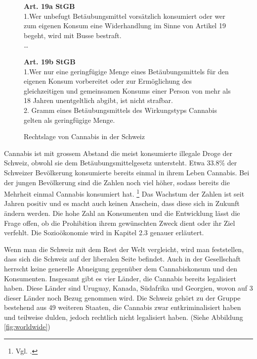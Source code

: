 \documentclass[../main.tex]{subfiles}
\begin{document}
	 \begin{figure}[H]
	 \begin{tcolorbox}
	 	\textbf{Art. 19a StGB}\\[7pt]
		1.\quad Wer unbefugt Betäubungsmittel vorsätzlich konsumiert oder wer zum eigenen Konsum eine Widerhandlung im Sinne von Artikel 19 begeht, wird mit Busse bestraft.\\[10pt]
		\ldots
	\end{tcolorbox}
	
	\begin{tcolorbox}
		\textbf{Art. 19b StGB}\\[7pt]
	 	1.\quad Wer nur eine geringfügige Menge eines Betäubungsmittels für den eigenen Konsum vorbereitet oder zur Ermöglichung des gleichzeitigen und gemeinsamen Konsums einer Person von mehr als 18 Jahren unentgeltlich abgibt, ist nicht strafbar.\\[10pt]
2. Gramm eines Betäubungsmittels des Wirkungstyps Cannabis gelten als geringfügige Menge.
	 \end{tcolorbox}
	 \captionsetup{font=small}
	 \caption{Rechtslage von Cannabis in der Schweiz}
	 \label{fig:stgb-art-19}
	 \end{figure}
	 
	 
	 \noindent
	 Cannabis ist mit grossem Abstand die meist konsumierte illegale Droge der Schweiz, obwohl sie dem Betäubungsmittelgesetz untersteht. 
	 Etwa 33.8\% der Schweizer Bevölkerung konsumierte bereits einmal in ihrem Leben Cannabis. 
	 Bei der jungen Bevölkerung sind die Zahlen noch viel höher, sodass bereits die Mehrheit einmal Cannabis konsumiert hat.%
	 \footnote{Vgl. \cite[85]{gmel}.}
	 Das Wachstum der Zahlen ist seit Jahren positiv und es macht auch keinen Anschein, dass diese sich in Zukunft ändern werden.
	 Die hohe Zahl an Konsumenten und die Entwicklung lässt die Frage offen, ob die Prohibition ihrem gewünschten Zweck dient oder ihr Ziel verfehlt.
	 Die Sozioökonomie wird in Kapitel 2.3 genauer erläutert.
	 
	 \noindent
	 Wenn man die Schweiz mit dem Rest der Welt vergleicht, wird man feststellen, dass sich die Schweiz auf der liberalen Seite befindet.
	 Auch in der Gesellschaft herrscht keine generelle Abneigung gegenüber dem Cannabiskonsum und den Konsumenten.	
	 Insgesamt gibt es vier Länder, die Cannabis bereits legalisiert haben.
	 Diese Länder sind Uruguay, Kanada, Südafrika und Georgien, wovon auf 3 dieser Länder noch Bezug genommen wird.
	 Die Schweiz gehört zu der Gruppe bestehend aus 49 weiteren Staaten, die Cannabis zwar entkriminalisiert haben und teilweise dulden, jedoch rechtlich nicht legalisiert haben. (Siehe Abbildung \ref{fig:worldwide})\\
	 
\end{document}
